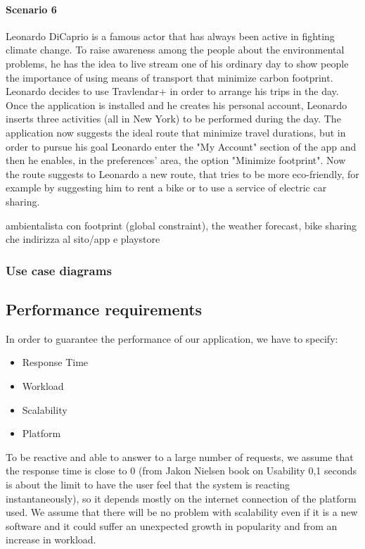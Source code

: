 \documentclass[12pt,titlepage]{article}
\begin{document}
\paragraph{Scenario 6}
Leonardo DiCaprio is a famous actor that has always been active in fighting climate change. To raise awareness among the people about the environmental problems, he has the idea to live stream one of his ordinary day to show people the importance of using means of transport that minimize carbon footprint. 
Leonardo decides to use Travlendar+ in order to arrange his trips in the day. Once the application is installed and he creates his personal account, Leonardo inserts three activities (all in New York) to be performed during the day. The application now suggests the ideal route that minimize travel durations, but in order to pursue his goal Leonardo enter the "My Account" section of the app and then he enables, in the preferences' area, the option "Minimize footprint". Now the route suggests to Leonardo a new route, that tries to be more eco-friendly, for example by suggesting him to rent a bike or to use a service of electric car sharing.

ambientalista con footprint (global constraint), the weather forecast, bike sharing che indirizza al sito/app e playstore

\subsubsection{Use case diagrams}\label{sec:mod1}

\subsection{Performance requirements}\label{sec:mod1}
In order to guarantee the performance of our application, we have to specify:
\begin{itemize}
\item Response Time 
\item Workload
\item Scalability
\item Platform
\end{itemize}
To be reactive and able to answer to a large number of requests, we assume that the response time is close to 0 (from Jakon Nielsen book on Usability 0,1 seconds is about the limit to have the user feel that the system is reacting instantaneously), so it depends mostly on the internet connection of the platform used. 
We assume that there will be no problem with scalability even if it is a new software and it could suffer an unexpected growth in popularity and from an increase in workload.
\end{document}
